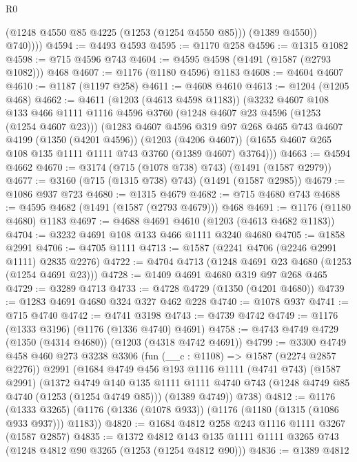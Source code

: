 \begin{lexlean}{R0}
\begin{coremodule}
              (@1248 @4550 @85 @4225 (@1253 (@1254 @4550 @85)))
              (@1389 @4550))
            @740))))
@4594 := @4493 @4593
@4595 := @1170 @258
@4596 := @1315 @1082
@4598 := @715 @4596 @743
@4604 := @4595 @4598 (@1491 (@1587 (@2793 @1082))) @468
@4607 := @1176 (@1180 @4596) @1183
@4608 := @4604 @4607
@4610 := @1187 (@1197 @258)
@4611 := @4608 @4610
@4613 := @1204 (@1205 @468)
@4662 := @4611
    (@1203 (@4613 @4598 @1183))
    (@3232
      @4607
      @108
      @133
      @466
      @1111
      @1116
      @4596
      @3760
      (@1248 @4607 @23 @4596 (@1253 (@1254 @4607 @23)))
      (@1283
        @4607
        @4596
        @319
        @97
        @268
        @465
        @743
        @4607
        @4199
        (@1350 (@4201 @4596))
        (@1203 (@4206 @4607))
        (@1655 @4607 @265 @108 @135 @1111 @1111 @743 @3760 (@1389 @4607) @3764)))
@4663 := @4594 @4662
@4670 := @3174 (@715 (@1078 @738) @743) (@1491 (@1587 @2979))
@4677 := @3160 (@715 (@1315 @738) @743) (@1491 (@1587 @2985))
@4679 := @1086 @937 @723
@4680 := @1315 @4679
@4682 := @715 @4680 @743
@4688 := @4595 @4682 (@1491 (@1587 (@2793 @4679))) @468
@4691 := @1176 (@1180 @4680) @1183
@4697 := @4688 @4691 @4610 (@1203 (@4613 @4682 @1183))
@4704 := @3232 @4691 @108 @133 @466 @1111 @3240 @4680
@4705 := @1858 @2991
@4706 := @4705 @1111
@4713 := @1587 (@2241 @4706 (@2246 @2991 @1111) @2835 @2276)
@4722 := @4704 @4713 (@1248 @4691 @23 @4680 (@1253 (@1254 @4691 @23)))
@4728 := @1409 @4691 @4680 @319 @97 @268 @465
@4729 := @3289 @4713
@4733 := @4728 @4729 (@1350 (@4201 @4680))
@4739 := @1283 @4691 @4680 @324 @327 @462 @228
@4740 := @1078 @937
@4741 := @715 @4740
@4742 := @4741 @3198
@4743 := @4739 @4742
@4749 := @1176 (@1333 @3196) (@1176 (@1336 @4740) @4691)
@4758 := @4743 @4749 @4729 (@1350 (@4314 @4680)) (@1203 (@4318 @4742 @4691))
@4799 := @3300
    @4749
    @458
    @460
    @273
    @3238
    @3306
    (fun (__c : @1108) => @1587 (@2274 @2857 @2276))
    @2991
    (@1684
      @4749
      @456
      @193
      @1116
      @1111
      (@4741 @743)
      (@1587 @2991)
      (@1372
        @4749
        @140
        @135
        @1111
        @1111
        @4740
        @743
        (@1248 @4749 @85 @4740 (@1253 (@1254 @4749 @85)))
        (@1389 @4749))
      @738)
@4812 := @1176
    (@1333 @3265)
    (@1176 (@1336 (@1078 @933)) (@1176 (@1180 (@1315 (@1086 @933 @937))) @1183))
@4820 := @1684 @4812 @258 @243 @1116 @1111 @3267 (@1587 @2857)
@4835 := @1372
    @4812
    @143
    @135
    @1111
    @1111
    @3265
    @743
    (@1248 @4812 @90 @3265 (@1253 (@1254 @4812 @90)))
@4836 := @1389 @4812

\end{coremodule}
\end{lexlean}
